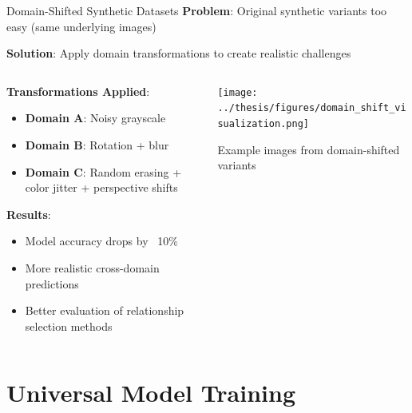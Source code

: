 \documentclass[aspectratio=169]{beamer}
\begin{document}
\begin{frame}{Domain-Shifted Synthetic Datasets}
    \textbf{Problem}: Original synthetic variants too easy (same underlying images)

    \vspace{0.5em}

    \textbf{Solution}: Apply domain transformations to create realistic challenges

    \begin{columns}[T]
        \begin{column}{0.6\textwidth}
            \textbf{Transformations Applied}:
            \begin{itemize}
                \item \textbf{Domain A}: Noisy grayscale
                \item \textbf{Domain B}: Rotation + blur
                \item \textbf{Domain C}: Random erasing + color jitter + perspective shifts
            \end{itemize}

            \vspace{1em}

            \textbf{Results}:
            \begin{itemize}
                \item Model accuracy drops by ~10\%
                \item More realistic cross-domain predictions
                \item Better evaluation of relationship selection methods
            \end{itemize}
        \end{column}

        \begin{column}{0.35\textwidth}
            \begin{center}
                \texttt{[image: ../thesis/figures/domain\_shift\_visualization.png]}
            \end{center}
            \small{Example images from domain-shifted variants}
        \end{column}
    \end{columns}
\end{frame}

\section{Universal Model Training}
\end{document}
